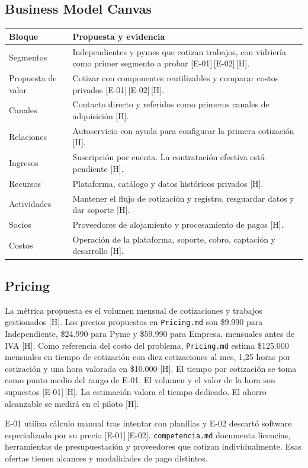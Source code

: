 \documentclass[11pt]{article}
\newcommand{\ev}[1]{\textcolor{prblue}{[#1]}}
\newcommand{\hip}{\textcolor{prorange}{[H]}}
\begin{document}
\subsection{Business Model Canvas}
\begin{tabularx}{\linewidth}{@{}lX@{}}
\toprule
\textbf{Bloque} & \textbf{Propuesta y evidencia} \\
\midrule
Segmentos & Independientes y pymes que cotizan trabajos, con vidriería como primer segmento a probar \ev{E-01}\,\ev{E-02}\,\hip. \\
Propuesta de valor & Cotizar con componentes reutilizables y comparar costos privados \ev{E-01}\,\ev{E-02}\,\hip. \\
Canales & Contacto directo y referidos como primeros canales de adquisición \hip. \\
Relaciones & Autoservicio con ayuda para configurar la primera cotización \hip. \\
Ingresos & Suscripción por cuenta. La contratación efectiva está pendiente \hip. \\
Recursos & Plataforma, catálogo y datos históricos privados \hip. \\
Actividades & Mantener el flujo de cotización y registro, resguardar datos y dar soporte \hip. \\
Socios & Proveedores de alojamiento y procesamiento de pagos \hip. \\
Costos & Operación de la plataforma, soporte, cobro, captación y desarrollo \hip. \\
\bottomrule
\end{tabularx}

\subsection{Pricing}
La métrica propuesta es el volumen mensual de cotizaciones y trabajos
gestionados \hip. Los precios propuestos en \texttt{Pricing.md} son
\$9.990 para Independiente, \$24.990 para Pyme y \$59.990 para Empresa,
mensuales antes de IVA \hip. Como referencia del costo del problema,
\texttt{Pricing.md} estima \$125.000 mensuales en tiempo de cotización
con diez cotizaciones al mes, 1,25 horas por cotización y una hora
valorada en \$10.000 \hip. El tiempo por cotización se toma como
punto medio del rango de E-01. El volumen y el valor de la hora son
supuestos \ev{E-01}\,\hip. La estimación valora el tiempo dedicado.
El ahorro alcanzable se medirá en el piloto \hip.

E-01 utiliza cálculo manual tras intentar
con planillas y E-02 descartó software especializado por su precio
\ev{E-01}\,\ev{E-02}. \texttt{competencia.md} documenta licencias,
herramientas de presupuestación y proveedores que cotizan individualmente.
Esas ofertas tienen alcances y modalidades de pago distintos.
\end{document}
